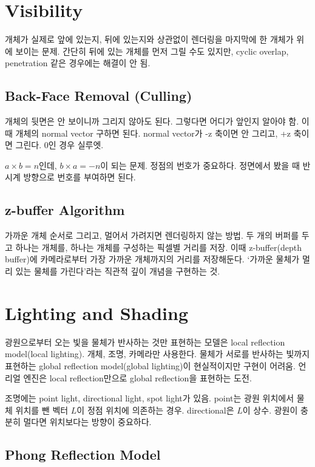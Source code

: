 \section{Visibility}

개체가 실제로 앞에 있는지, 뒤에 있는지와 상관없이 렌더링을 마지막에 한 개체가 위에 보이는 문제. 간단히 뒤에 있는 개체를 먼저 그릴 수도 있지만, cyclic overlap, penetration 같은 경우에는 해결이 안 됨.

\subsection{Back-Face Removal (Culling)}

개체의 뒷면은 안 보이니까 그리지 않아도 된다. 그렇다면 어디가 앞인지 알아야 함. 이때 개체의 normal vector 구하면 된다. normal vector가 -z 축이면 안 그리고, +z 축이면 그린다. 0인 경우 실루엣.

$a \times b = n$인데, $b \times a = -n$이 되는 문제. 정점의 번호가 중요하다. 정면에서 봤을 때 반시계 방향으로 번호를 부여하면 된다.

\subsection{z-buffer Algorithm}

가까운 개체 순서로 그리고, 멀어서 가려지면 렌더링하지 않는 방법. 두 개의 버퍼를 두고 하나는 개체를, 하나는 개체를 구성하는 픽셀별 거리를 저장. 이때 z-buffer(depth buffer)에 카메라로부터 가장 가까운 개체까지의 거리를 저장해둔다. `가까운 물체가 멀리 있는 물체를 가린다'라는 직관적 깊이 개념을 구현하는 것.

\section{Lighting and Shading}

광원으로부터 오는 빛을 물체가 반사하는 것만 표현하는 모델은 local reflection model(local lighting). 개체, 조명, 카메라만 사용한다. 물체가 서로를 반사하는 빛까지 표현하는 global reflection model(global lighting)이 현실적이지만 구현이 어려움. 언리얼 엔진은 local reflection만으로 global reflection을 표현하는 도전.

조명에는 point light, directional light, spot light가 있음. point는 광원 위치에서 물체 위치를 뺀 벡터 $L$이 정점 위치에 의존하는 경우. directional은 $L$이 상수. 광원이 충분히 멀다면 위치보다는 방향이 중요하다.

\subsection{Phong Reflection Model}

